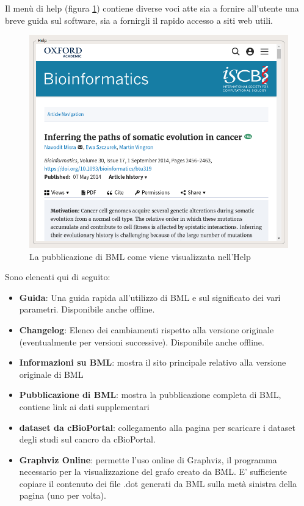 \documentclass[a4paper]{article}
\begin{document}
	Il menù di help (figura \ref{fig:BMLHelp}) contiene diverse voci atte sia a fornire all'utente una breve guida sul software, sia a
	fornirgli il rapido accesso a siti web utili.

	\begin{figure}[h]
	  \centering
	  \includegraphics[scale=0.43, keepaspectratio]{BMLHelp.png}%
	  \captionsetup{justification=centering,margin=0.5cm}
	  \caption{La pubblicazione di BML come viene visualizzata nell'Help} \label{fig:BMLHelp}
	\end{figure}

	Sono elencati qui di seguito:
	\begin{itemize}
	\item \textbf{Guida}: Una guida rapida all'utilizzo di BML e sul significato dei vari parametri. Disponibile
	anche offline.
	\item \textbf{Changelog}: Elenco dei cambiamenti rispetto alla versione originale (eventualmente per 
	versioni successive). Disponibile anche offline.
	\item \textbf{Informazioni su BML}: mostra il sito principale relativo alla versione originale di BML
	\item \textbf{Pubblicazione di BML}: mostra la pubblicazione completa di BML, contiene link ai dati supplementari
	\item \textbf{dataset da cBioPortal}: collegamento alla pagina per scaricare i dataset degli studi sul cancro da
	cBioPortal. 
	\item \textbf{Graphviz Online}: permette l'uso online di Graphviz, il programma necessario per la 
	visualizzazione del grafo creato da BML. E' sufficiente copiare il contenuto dei file .dot
	generati da BML sulla metà sinistra della pagina (uno per volta).
	\end{itemize}
\end{document}

